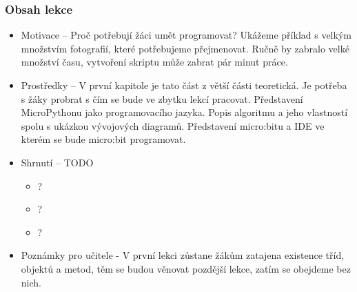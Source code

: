 \documentclass[
  digital,     %
  oneside,     %
  nosansbold,  %
  colorbold, %
  lof,         %
  nolot,         %
]{fithesis4}
\begin{document}
\subsubsection{Obsah lekce}
\begin{itemize}
    \item Motivace -- Proč potřebují žáci umět programovat? Ukážeme příklad s velkým množstvím fotografií, které potřebujeme přejmenovat. Ručně by zabralo velké množství času, vytvoření skriptu může zabrat pár minut práce.
    \item Prostředky -- V první kapitole je tato část z větší části teoretická. Je potřeba s žáky probrat s čím se bude ve zbytku lekcí pracovat. Představení MicroPythonu jako programovacího jazyka. Popis algoritmu a jeho vlastností spolu s ukázkou vývojových diagramů. Představení micro:bitu a IDE ve kterém se bude micro:bit programovat. 
    \item Shrnutí -- TODO
    \begin{itemize}
        \item ?
        \item ?
        \item ?
    \end{itemize}
    \item Poznámky pro učitele - V první lekci zůstane žákům zatajena existence tříd, objektů a metod, těm se budou věnovat pozdější lekce, zatím se obejdeme bez nich.
\end{itemize}
\end{document}
